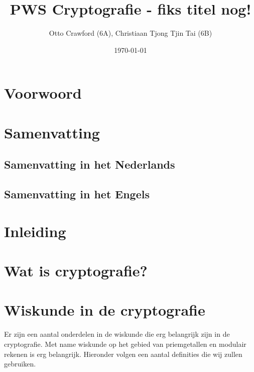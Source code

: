 \documentclass{report} %
\title{PWS Cryptografie - fiks titel nog!}
\author{Otto Crawford (6A), Christiaan Tjong Tjin Tai (6B)}
\date{\today}
\begin{document}
\maketitle

\tableofcontents

\chapter{Voorwoord}

\chapter{Samenvatting}
\section{Samenvatting in het Nederlands}
\section{Samenvatting in het Engels}


\chapter{Inleiding}

\chapter{Wat is cryptografie?}

\chapter{Wiskunde in de cryptografie}
Er zijn een aantal onderdelen in de wiskunde die erg belangrijk zijn in de cryptografie. Met name wiskunde op het gebied van priemgetallen en modulair rekenen is erg belangrijk. Hieronder volgen een aantal definities die wij zullen gebruiken.
\end{document}
